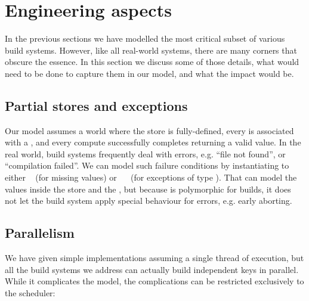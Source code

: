 \section{Engineering aspects}\label{sec-engineering}

In the previous sections we have modelled the most critical subset of various
build systems. However, like all real-world systems, there are many corners that
obscure the essence. In this section we discuss some of those details, what
would need to be done to capture them in our model, and what the impact would be.

\subsection{Partial stores and exceptions}

Our model assumes a world where the store is fully-defined, every  is
associated with a , and every compute successfully completes returning a
valid value. In the real world, build systems frequently deal with errors, e.g.
``file not found'', or ``compilation failed''. We can model such failure
conditions by instantiating  to either ~ (for missing
values) or ~~ (for exceptions of type ). That can
model the values inside the store and the , but because  is
polymorphic for builds, it does not let the build system apply special behaviour
for errors, e.g. early aborting.


\subsection{Parallelism}\label{sec-parallelism}

We have given simple implementations assuming a single thread of execution,
but all the build systems we address can actually build independent keys in parallel.
While it complicates the model, the complications can be restricted exclusively
to the scheduler:

